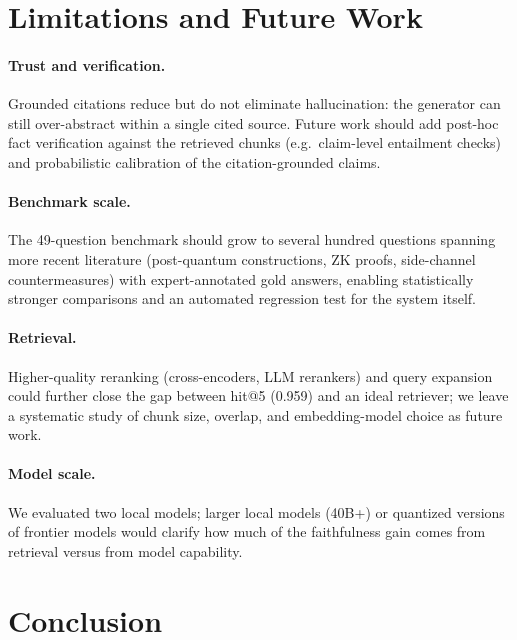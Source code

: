 \documentclass[version=submission]{iacrcc}
\begin{document}
\section{Limitations and Future Work}

\paragraph{Trust and verification.}
Grounded citations reduce but do not eliminate hallucination: the generator
can still over-abstract within a single cited source. Future work should add
post-hoc fact verification against the retrieved chunks (e.g.\ claim-level
entailment checks) and probabilistic calibration of the citation-grounded
claims.

\paragraph{Benchmark scale.}
The 49-question benchmark should grow to several hundred questions spanning
more recent literature (post-quantum constructions, ZK proofs, side-channel
countermeasures) with expert-annotated gold answers, enabling statistically
stronger comparisons and an automated regression test for the system itself.

\paragraph{Retrieval.}
Higher-quality reranking (cross-encoders, LLM rerankers) and query expansion
could further close the gap between hit@5 (0.959) and an ideal retriever; we
leave a systematic study of chunk size, overlap, and embedding-model choice as
future work.

\paragraph{Model scale.}
We evaluated two local models; larger local models (40B+) or quantized
versions of frontier models would clarify how much of the faithfulness gain
comes from retrieval versus from model capability.

\section{Conclusion}
\end{document}
